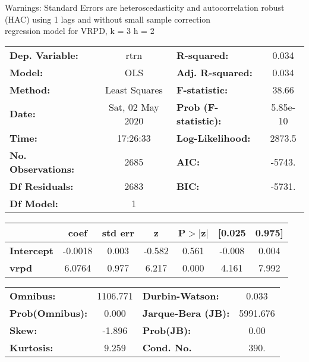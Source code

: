 Warnings: \newline
 [1] Standard Errors are heteroscedasticity and autocorrelation robust (HAC) using 1 lags and without small sample correction\\ 

regression model for VRPD, k = 3 h = 2\begin{center}
\begin{tabular}{lclc}
\toprule
\textbf{Dep. Variable:}    &       rtrn       & \textbf{  R-squared:         } &     0.034   \\
\textbf{Model:}            &       OLS        & \textbf{  Adj. R-squared:    } &     0.034   \\
\textbf{Method:}           &  Least Squares   & \textbf{  F-statistic:       } &     38.66   \\
\textbf{Date:}             & Sat, 02 May 2020 & \textbf{  Prob (F-statistic):} &  5.85e-10   \\
\textbf{Time:}             &     17:26:33     & \textbf{  Log-Likelihood:    } &    2873.5   \\
\textbf{No. Observations:} &        2685      & \textbf{  AIC:               } &    -5743.   \\
\textbf{Df Residuals:}     &        2683      & \textbf{  BIC:               } &    -5731.   \\
\textbf{Df Model:}         &           1      & \textbf{                     } &             \\
\bottomrule
\end{tabular}
\begin{tabular}{lcccccc}
                   & \textbf{coef} & \textbf{std err} & \textbf{z} & \textbf{P$> |$z$|$} & \textbf{[0.025} & \textbf{0.975]}  \\
\midrule
\textbf{Intercept} &      -0.0018  &        0.003     &    -0.582  &         0.561        &       -0.008    &        0.004     \\
\textbf{vrpd}      &       6.0764  &        0.977     &     6.217  &         0.000        &        4.161    &        7.992     \\
\bottomrule
\end{tabular}
\begin{tabular}{lclc}
\textbf{Omnibus:}       & 1106.771 & \textbf{  Durbin-Watson:     } &    0.033  \\
\textbf{Prob(Omnibus):} &   0.000  & \textbf{  Jarque-Bera (JB):  } & 5991.676  \\
\textbf{Skew:}          &  -1.896  & \textbf{  Prob(JB):          } &     0.00  \\
\textbf{Kurtosis:}      &   9.259  & \textbf{  Cond. No.          } &     390.  \\
\bottomrule
\end{tabular}
\end{center}

